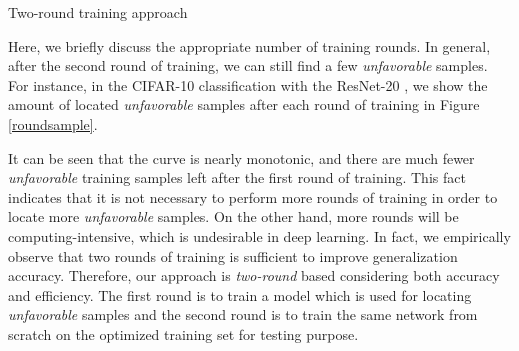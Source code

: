 \documentclass[10pt, conference, letterpaper]{IEEEtran}
\begin{document}
\begin{algorithm}[tp]
 
\Begin{
Train $f_{\theta_{0}}$ on $\mathcal{X}$ to obtain $f_{\theta}$\;
\For{$i\leftarrow 1$ \KwTo $len$($\mathcal{X}$)}{
\For{$j\leftarrow 1$ \KwTo $len$($\mathcal{V}$)}{ use $f_{\theta}$ to
\textbf{compute} $I_{loss}(\mathcal{X}(i)$, $\mathcal{V}(j))$;
}
\If{$\sum_{j}I_{loss}(\mathcal{X}(i)$, $\mathcal{V}(j))>0$}
   {\textbf{remove} $\mathcal{X}(i)$ from $\mathcal{X}$;}
}   
$\mathcal{X'}$ is obtained\;
Train $f_{\theta_{0}}$ on $\mathcal{X'}$ to obtain $f_{\theta'}$\;
}
\caption{Two-round training approach}
\label{algo_iterative}
\end{algorithm} %

Here, we briefly discuss the appropriate number of training rounds. In general, after the second round of training, we can still find a few \emph{unfavorable} samples. For instance, in the CIFAR-10 classification with the ResNet-20 \cite{he2016deep}, we show the amount of located \emph{unfavorable} samples after each round of training in Figure \ref{roundsample}. 
 
It can be seen that the curve is nearly monotonic, and there are much fewer \emph{unfavorable} training samples left after the first round of training. This fact indicates that it is not necessary to perform more rounds of training in order to locate more \emph{unfavorable} samples. On the other hand, more rounds will be computing-intensive, which is undesirable in deep learning. In fact, we empirically observe that two rounds of training is sufficient to improve generalization accuracy. Therefore, our approach is \emph{two-round} based considering both accuracy and efficiency. The first round is to train a model which is used for locating \emph{unfavorable} samples and the second round is to train the same network from scratch on the optimized training set for testing purpose.
\end{document}
